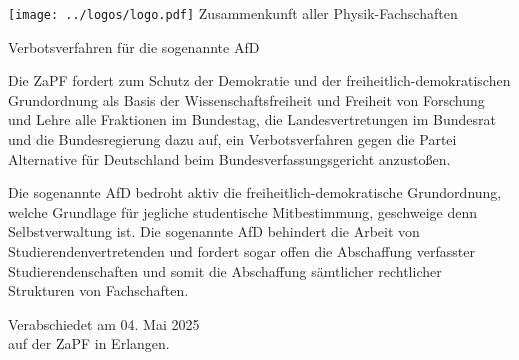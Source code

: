 \documentclass[DIV=calc]{scrartcl}
\let\oldgrqq=\grqq
\def\grqq{\oldgrqq\xspace}
\begin{document}
\hspace{0.87\textwidth}
\begin{minipage}{120pt}
	\vspace{-1.8cm}
	\texttt{[image: ../logos/logo.pdf]}
	\centering
	\small Zusammenkunft aller Physik-Fachschaften
\end{minipage}

\begin{center}
  \huge{Verbotsverfahren für die sogenannte \glqq AfD\grqq}
  \vspace{.25\baselineskip}
  \normalsize
\end{center}
\vspace{1cm}








Die ZaPF fordert zum Schutz der Demokratie und der freiheitlich-demokratischen Grundordnung als Basis
der Wissenschaftsfreiheit und Freiheit von Forschung und Lehre alle Fraktionen im Bundestag, die Landesvertretungen im Bundesrat und die Bundesregierung dazu auf, ein Verbotsverfahren gegen die
Partei \glqq Alternative für Deutschland\grqq{} beim Bundesverfassungsgericht anzustoßen.

Die sogenannte AfD bedroht aktiv die freiheitlich-demokratische Grundordnung, welche Grundlage für jegliche studentische Mitbestimmung, geschweige denn Selbstverwaltung ist. Die sogenannte AfD behindert die Arbeit von Studierendenvertretenden und fordert sogar offen die Abschaffung verfasster Studierendenschaften und somit die Abschaffung sämtlicher rechtlicher Strukturen von
Fachschaften.



\vspace{1cm} 
%
\vfill
\begin{flushright}
	Verabschiedet am 04. Mai 2025 \\
	auf der ZaPF in Erlangen.
\end{flushright}
\end{document}
